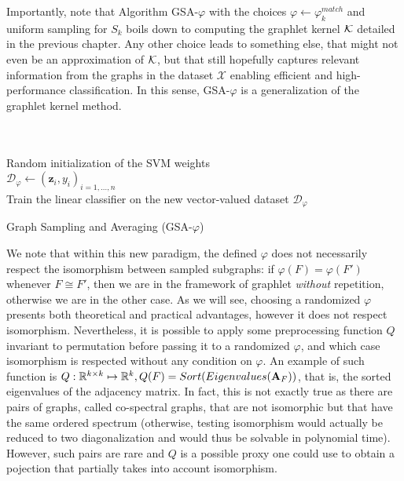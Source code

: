 Importantly, note that Algorithm GSA-$\varphi$ with the choices $\varphi\leftarrow\varphi^{match}_k$ and uniform sampling for $S_k$ boils down to computing the graphlet kernel $\mathcal{K}$ detailed in the previous chapter. Any other choice leads to something else, that might not even be an approximation of $\mathcal{K}$, but that still hopefully captures relevant information from the graphs in the dataset $\mathcal{X}$ enabling efficient and high-performance classification. In this sense, GSA-$\varphi$ is a generalization of the graphlet kernel method. 

\begin{algorithm}[t]
	
\DontPrintSemicolon
  \\
  \\
  \Algo{\\}
  Random initialization of the SVM weights\\
  $\mathcal{D}_{\varphi}\gets (\mathbf{z}_i,y_i)_{i=1,\ldots, n}$\\
  Train the linear classifier on the new vector-valued dataset $\mathcal{D}_{\varphi}$
\caption{Graph Sampling and Averaging (GSA-$\varphi$)}
\end{algorithm}

We note that within this new paradigm, the defined $\varphi$ does not necessarily respect the isomorphism between sampled subgraphs: if $\varphi(F) = \varphi(F')$ whenever $F \cong F'$, then we are in the framework of graphlet \emph{without} repetition, otherwise we are in the other case. As we will see, choosing a randomized $\varphi$ presents both theoretical and practical advantages, however it does not respect isomorphism. Nevertheless, it is possible to apply some preprocessing function $Q$ invariant to permutation before passing it to a randomized $\varphi$, and which case isomorphism is respected without any condition on $\varphi$. An example of such function is $Q:\mathbb{R}^{k\times k}\mapsto \mathbb{R}^k, Q(F)=Sort(Eigenvalues(\mathbf{A}_F))$, that is, the sorted eigenvalues of the adjacency matrix. In fact, this is not exactly true as there are pairs of graphs, called co-spectral graphs, that are not isomorphic but that have the same ordered spectrum (otherwise, testing isomorphism would actually be reduced to two diagonalization and would thus be solvable in polynomial time). However, such pairs are rare and $Q$ is a possible proxy one could use to obtain a pojection that partially takes into account isomorphism.

